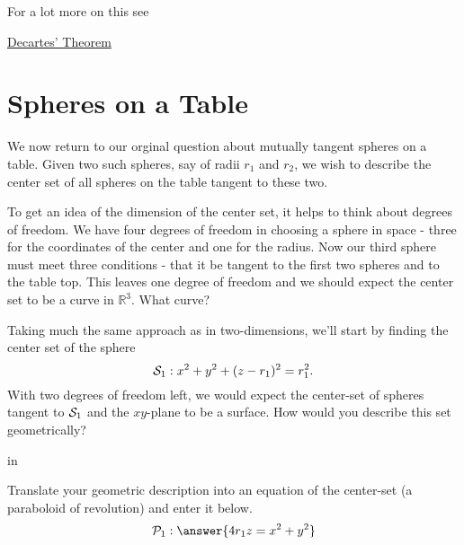\documentclass{ximera}
\newcommand{\pskip}{\vskip 0.1 in}
\begin{document}
For a lot more on this see

\href{https://en.wikipedia.org/wiki/Descartes%27_theorem}{Decartes' Theorem}


\section{Spheres on a Table}
We now return to our orginal question about mutually tangent spheres on a table. Given two such spheres, say of radii $r_1$ and $r_2$, we wish to describe the center set of all spheres on the table tangent to these two. 

To get an idea of the dimension of the center set, it helps to think about degrees of freedom. We have four degrees of freedom in choosing a sphere in space - three for the coordinates of the center and one for the radius. Now our third sphere must meet three conditions - that it be tangent to the first two spheres and to the table top. This leaves one degree of freedom and we should expect the center set to be a curve in $\mathbb{R}^3$. What curve?



\begin{question}    \label{Q23423:Spheres}
  
Taking much the same approach as in two-dimensions, we'll start by finding the center set of the sphere %
\[
      {\cal S}_1:    x^2 + y^2 + (z-r_1)^2 = r_1^2 .
\]
With two degrees of freedom left, we would expect the center-set of spheres tangent to ${\cal S}_1$ and the $xy$-plane to be a surface. How would you describe this set geometrically?
 
  \begin{selectAll}  
  \end{selectAll}  

\pskip

Translate your geometric description into an equation of the center-set (a paraboloid of revolution) and enter it below.
\[
   {\cal P}_1:  \answer{4 r_1z  = x^2 + y^2}
\]
\end{question}
\end{document}
